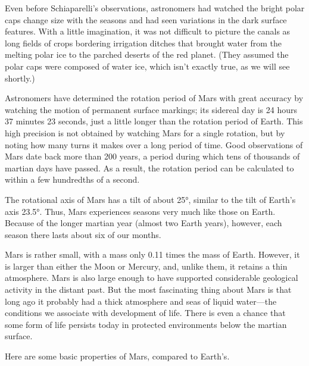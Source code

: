 \documentclass{article}
\numberwithin{equation}{section}
\numberwithin{figure}{section}
\begin{document}
\vspace{1em}

Even before Schiaparelli's observations, astronomers had watched the bright polar caps change size with the seasons and had seen variations in the dark surface features. With a little imagination, it was not difficult to picture the canals as long fields of crops bordering irrigation ditches that brought water from the melting polar ice to the parched deserts of the red planet. (They assumed the polar caps were composed of water ice, which isn't exactly true, as we will see shortly.)

\vspace{1em}

Astronomers have determined the rotation period of Mars with great accuracy by watching the motion of permanent surface markings; its sidereal day is 24 hours 37 minutes 23 seconds, just a little longer than the rotation period of Earth. This high precision is not obtained by watching Mars for a single rotation, but by noting how many turns it makes over a long period of time. Good observations of Mars date back more than 200 years, a period during which tens of thousands of martian days have passed. As a result, the rotation period can be calculated to within a few hundredths of a second.

\vspace{1em}

The rotational axis of Mars has a tilt of about \ang{25}, similar to the tilt of Earth's axis \ang{23.5}. Thus, Mars experiences seasons very much like those on Earth. Because of the longer martian year (almost two Earth years), however, each season there lasts about six of our months.

\vspace{1em}

Mars is rather small, with a mass only 0.11 times the mass of Earth. However, it is larger than either the Moon or Mercury, and, unlike them, it retains a thin atmosphere. Mars is also large enough to have supported considerable geological activity in the distant past. But the most fascinating thing about Mars is that long ago it probably had a thick atmosphere and seas of liquid water---the conditions we associate with development of life. There is even a chance that some form of life persists today in protected environments below the martian surface.
			
\clearpage

Here are some basic properties of Mars, compared to Earth's.
\end{document}
